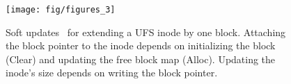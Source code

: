 \begin{comment}
appr to the
block out when a block is removed from a file, we create (at least) two
\patches\ in most file systems: one that clears out the reference to that
block number in the file's list of blocks, and one that marks the block as
free. By hooking up the second \patch\ to depend upon the first, we can
implement the soft updates semantic straightforwardly. Another example is
depicted in Figure~\ref{fig:softupdate}.
\end{comment}

\begin{figure}[t]
  \centering
  \texttt{[image: fig/figures\_3]}
  \caption{\label{fig:softupdate} Soft updates \patches\
  for extending a UFS inode by one block.
  Attaching the block pointer to the inode depends on
  initializing the block (Clear) and updating the free block map (Alloc).
  Updating the inode's size depends on writing the block
  pointer.}
\end{figure}


\begin{comment}
The \Kudos\ approach can take more memory than the BSD soft updates approach,
which limits the state required by any individual file system operation; we do
not yet address the issue of memory exhaustion.
%
However, \Kudos\ separates dependency enforcement from dependency
specification. This makes the actual implementation easier to read, and allows
the dependency structure to be examined and modified by other \modules\ of the
system that may not have any idea what the changes are actually doing.
\end{comment}
